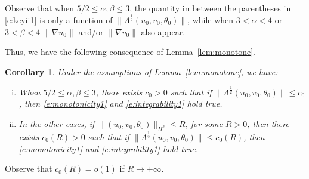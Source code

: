 \documentclass[a4paper]{article}
\newtheorem{cor}[thm]{Corollary}
\begin{document}
  Observe that when {$5/2 \le \alpha, \beta \le 3$}, the quantity in
  between the parentheses in \eqref{e:keyii1} is only a function of
  $\|\Lambda^\frac12 (u_0,v_0,\theta_0)\|$, while when $3<\alpha<4$ or
  $3< \beta <4$ $\|\nabla u_0\|$ and/or $\|\nabla v_0\|$ also appear.

  \smallskip

  Thus, we have the following consequence of Lemma~\ref{lem:monotone}.

\begin{cor}
\label{cor:monotone}
  Under the assumptions of Lemma~\ref{lem:monotone}, we have:
  \begin{enumerate}[(i)]
  \item When {$5/2 \le \alpha, \beta \le 3$}, there exists $c_0>0$ such
    that if $\|\Lambda^\frac12 (u_0,v_0,\theta_0)\| \le c_0$, then
    \eqref{e:monotonicity1} and \eqref{e:integrability1} hold
    true.\\[-0.3 cm]

  \item In the other cases, if $\|(u_0, v_0, \theta_0)\|_{H^2} \le R$,
    for some $R>0$, then there exists $c_0(R)>0$ such that if
    $\|\Lambda^\frac12 (u_0,v_0,\theta_0)\| \le c_0(R)$, then
    \eqref{e:monotonicity1} and \eqref{e:integrability1} hold true.
  \end{enumerate}
\end{cor}

Observe that $c_0(R) =o(1)$ if $R\to +\infty$.
\end{document}
